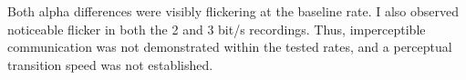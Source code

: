 Both alpha differences were visibly flickering at the baseline rate. I also observed noticeable flicker in both the 2 and 3 bit/s recordings. Thus, imperceptible communication was not demonstrated within the tested rates, and a perceptual transition speed was not established.
